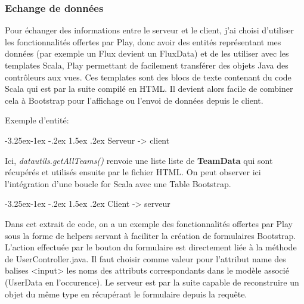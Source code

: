 \documentclass[french]{article}
\makeatletter
\renewcommand\paragraph{\@startsection{paragraph}{4}{\z@}%
                                     {-3.25ex\@plus -1ex \@minus -.2ex}%
                                     {1.5ex \@plus .2ex}%
                                     {\normalfont\normalsize\bfseries}}
\makeatother
\begin{document}
\subsubsection{Echange de données}

Pour échanger des informations entre le serveur et le client, j'ai choisi  d'utiliser les fonctionnalités offertes par Play, donc avoir des entités représentant mes données (par exemple un Flux devient un FluxData) et de les utiliser avec les templates Scala, Play permettant de facilement transférer des objets Java des contrôleurs aux vues. Ces templates sont des blocs de texte contenant du code Scala qui est par la suite compilé en HTML. Il devient alors facile de combiner cela à Bootstrap pour l'affichage ou l'envoi de données depuis le client.

Exemple d'entité:



\paragraph{Serveur -> client}



Ici, \textit{datautils.getAllTeams()} renvoie une liste liste de \textbf{TeamData} qui sont récupérés et utilisés ensuite par le fichier HTML. On peut observer ici l'intégration d'une boucle for Scala avec une Table Bootstrap.

\newpage
\paragraph{Client -> serveur}



Dans cet extrait de code, on a un exemple des fonctionnalités offertes par Play sous la forme de helpers servant à faciliter la création de formulaires Bootstrap. L'action effectuée par le bouton du formulaire est directement liée à la méthode de UserController.java. Il faut choisir comme valeur pour l'attribut name des balises <input> les noms des attributs correspondants dans le modèle associé (UserData en l'occurence).\newline
Le serveur est par la suite capable de reconstruire un objet du même type en récupérant le formulaire depuis la requête.
\end{document}
